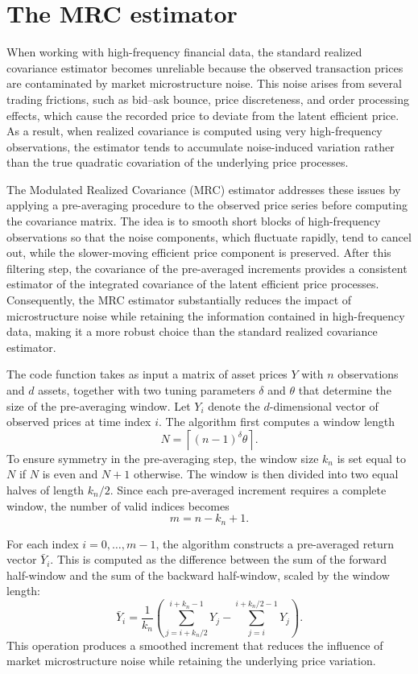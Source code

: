 \documentclass[12pt]{amsart}
\numberwithin{equation}{section}
\newcommand{\1}{\mathbf{1}}
\begin{document}
\section{The MRC estimator}
\label{mrc}
When working with high-frequency financial data, the standard realized covariance estimator becomes unreliable because the observed transaction prices are contaminated by market microstructure noise. This noise arises from several trading frictions, such as bid–ask bounce, price discreteness, and order processing effects, which cause the recorded price to deviate from the latent efficient price. As a result, when realized covariance is computed using very high-frequency observations, the estimator tends to accumulate noise-induced variation rather than the true quadratic covariation of the underlying price processes.

The Modulated Realized Covariance (MRC) estimator addresses these issues by applying a pre-averaging procedure to the observed price series before computing the covariance matrix. The idea is to smooth short blocks of high-frequency observations so that the noise components, which fluctuate rapidly, tend to cancel out, while the slower-moving efficient price component is preserved. After this filtering step, the covariance of the pre-averaged increments provides a consistent estimator of the integrated covariance of the latent efficient price processes. Consequently, the MRC estimator substantially reduces the impact of microstructure noise while retaining the information contained in high-frequency data, making it a more robust choice than the standard realized covariance estimator.

The code function takes as input a matrix of asset prices $Y$ with $n$ observations and $d$ assets, together with two tuning parameters $\delta$ and $\theta$ that determine the size of the pre-averaging window. Let $Y_i$ denote the $d$-dimensional vector of observed prices at time index $i$. The algorithm first computes a window length
\[
N = \left\lceil (n-1)^{\delta}\theta \right\rceil .
\]
To ensure symmetry in the pre-averaging step, the window size $k_n$ is set equal to $N$ if $N$ is even and $N+1$ otherwise. The window is then divided into two equal halves of length $k_n/2$. Since each pre-averaged increment requires a complete window, the number of valid indices becomes
\[
m = n - k_n + 1 .
\]

For each index $i = 0, \dots, m-1$, the algorithm constructs a pre-averaged return vector $\bar{Y}_i$. This is computed as the difference between the sum of the forward half-window and the sum of the backward half-window, scaled by the window length:
\[
\bar{Y}_i =
\frac{1}{k_n}
\left(
\sum_{j=i+k_n/2}^{i+k_n-1} Y_j
-
\sum_{j=i}^{i+k_n/2-1} Y_j
\right).
\]
This operation produces a smoothed increment that reduces the influence of market microstructure noise while retaining the underlying price variation.
\end{document}
